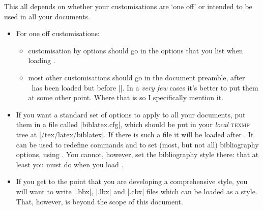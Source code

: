 This all depends on whether your customisations are `one off' or
intended to be used in all your documents.
\begin{itemize}
\item For one off customisations:
\begin{itemize}
\item customisation by options should go in the options that you list
  when loading \biblatex.
\item most other customisations should go in the document preamble, after
  \biblatex\ has been loaded but before ||. In a \emph{very
  few} cases it's better to put them at some other point. Where that is so
  I specifically mention it.
\end{itemize}
\item If you want a standard set of options to apply to all your
  documents, put them in a file called |biblatex.cfg|, which should be
  put in your \emph{local} \textsc{texmf} tree at
  |/tex/latex/biblatex|. If there is such a file it will be loaded
  after \biblatex. It can be used to redefine commands and to set
  (most, but not all) bibliography options, using
  . You
  cannot, however, set the bibliography style there: that at least you
  must do when you load \biblatex.
\item If you get to the point that you
  are developing a comprehensive style, you will want to write |.bbx|,
  |.lbx| and |.cbx| files which can be loaded as a style. That,
  however, is beyond the scope of this document.
\end{itemize}

